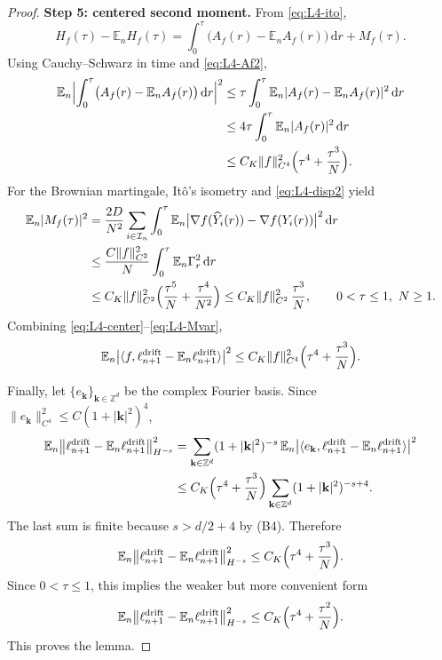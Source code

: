 \documentclass[a4paper,fleqn]{cas-sc}
\theoremstyle{definition}
\theoremstyle{remark}
\begin{document}
\begin{proof}
\medskip
\noindent\textbf{Step 5: centered second moment.}
From \eqref{eq:L4-ito},
\begin{equation}\label{eq:L4-center}
H_f(\tau)-\mathbb E_nH_f(\tau)
=\int_0^\tau\bigl(A_f(r)-\mathbb E_nA_f(r)\bigr)\,\mathrm dr+M_f(\tau).
\end{equation}
Using Cauchy--Schwarz in time and \eqref{eq:L4-Af2},
\begin{equation}\label{eq:L4-driftvar}
\begin{aligned}
\mathbb E_n\Bigl|\int_0^\tau\bigl(A_f(r)-\mathbb E_nA_f(r)\bigr)\,\mathrm dr\Bigr|^2
&\le\tau\int_0^\tau\mathbb E_n|A_f(r)-\mathbb E_nA_f(r)|^2\,\mathrm dr\\
&\le4\tau\int_0^\tau\mathbb E_n|A_f(r)|^2\,\mathrm dr\\
&\le C_K\|f\|_{C^4}^2\Bigl(\tau^4+\frac{\tau^3}{N}\Bigr).
\end{aligned}
\end{equation}
For the Brownian martingale, It\^o's isometry and \eqref{eq:L4-disp2} yield
\begin{equation}\label{eq:L4-Mvar}
\begin{aligned}
\mathbb E_n|M_f(\tau)|^2
&=\frac{2D}{N^2}\sum_{i\in\mathcal I_n}\int_0^\tau\mathbb E_n\bigl|\nabla f(\widehat Y_i(r))-\nabla f(Y_i(r))\bigr|^2\,\mathrm dr\\
&\le\frac{C\|f\|_{C^2}^2}{N}\int_0^\tau\mathbb E_n\Gamma_r^2\,\mathrm dr\\
&\le C_K\|f\|_{C^2}^2\Bigl(\frac{\tau^5}{N}+\frac{\tau^4}{N^2}\Bigr)
\le C_K\|f\|_{C^2}^2\,\frac{\tau^3}{N},\qquad 0<\tau\le1,\ N\ge1 .
\end{aligned}
\end{equation}
Combining \eqref{eq:L4-center}--\eqref{eq:L4-Mvar},
\[
\mathbb E_n\bigl|\langle f,\ell^{\mathrm{drift}}_{n+1}-\mathbb E_n\ell^{\mathrm{drift}}_{n+1}\rangle\bigr|^2
\le C_K\|f\|_{C^4}^2\Bigl(\tau^4+\frac{\tau^3}{N}\Bigr).
\]

Finally, let $\{e_{\mathbf k}\}_{\mathbf k\in\mathbb Z^d}$ be the complex Fourier basis.
Since $\|e_{\mathbf k}\|_{C^4}^2\le C(1+|\mathbf k|^2)^4$,
\[
\begin{aligned}
\mathbb E_n\bigl\|\ell^{\mathrm{drift}}_{n+1}-\mathbb E_n\ell^{\mathrm{drift}}_{n+1}\bigr\|_{H^{-s}}^2
&=\sum_{\mathbf k\in\mathbb Z^d}(1+|\mathbf k|^2)^{-s}\,
\mathbb E_n\bigl|\langle e_{\mathbf k},\ell^{\mathrm{drift}}_{n+1}-\mathbb E_n\ell^{\mathrm{drift}}_{n+1}\rangle\bigr|^2\\
&\le C_K\Bigl(\tau^4+\frac{\tau^3}{N}\Bigr)\sum_{\mathbf k\in\mathbb Z^d}(1+|\mathbf k|^2)^{-s+4}.
\end{aligned}
\]
The last sum is finite because $s>d/2+4$ by (B4). Therefore
\[
\mathbb E_n\bigl\|\ell^{\mathrm{drift}}_{n+1}-\mathbb E_n\ell^{\mathrm{drift}}_{n+1}\bigr\|_{H^{-s}}^2
\le C_K\Bigl(\tau^4+\frac{\tau^3}{N}\Bigr).
\]
Since $0<\tau\le1$, this implies the weaker but more convenient form
\[
\mathbb E_n\bigl\|\ell^{\mathrm{drift}}_{n+1}-\mathbb E_n\ell^{\mathrm{drift}}_{n+1}\bigr\|_{H^{-s}}^2
\le C_K\Bigl(\tau^4+\frac{\tau^2}{N}\Bigr).
\]
This proves the lemma.
\end{proof}
\end{document}
